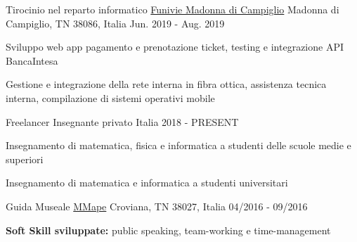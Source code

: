 \begin{cventries}
\cventry
{Tirocinio nel reparto informatico} %
{\href{https://www.funiviecampiglio.it}{Funivie Madonna di Campiglio}} %
{Madonna di Campiglio, TN 38086, Italia} %
{Jun. 2019 - Aug. 2019} %
{
  \begin{cvitems} %
    \item {Sviluppo web app pagamento e prenotazione ticket, testing e integrazione API BancaIntesa}
    \item {Gestione e integrazione della rete interna in fibra ottica, assistenza tecnica interna, compilazione di sistemi operativi mobile}
  \end{cvitems}
  }

\cventry
{Freelancer} %
{Insegnante privato} %
{Italia} %
{2018 - PRESENT} %
{
  \begin{cvitems} %
    \item {Insegnamento di matematica, fisica e informatica a studenti delle scuole medie e superiori}
    \item {Insegnamento di matematica e informatica a studenti universitari}
  \end{cvitems}
}


\cventry
{Guida Museale} %
{\href{https://www.mmape.it}{MMape}} %
{Croviana, TN 38027, Italia} %
{04/2016 - 09/2016} %
{
  \begin{cvitems} %
    \item {\textbf{Soft Skill sviluppate:} public speaking, team-working e time-management}
  \end{cvitems}
}



\end{cventries}
